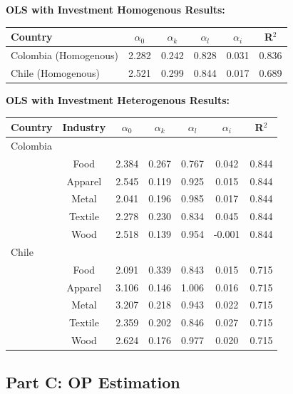 \documentclass{article}
\begin{document}
\textbf{OLS with Investment Homogenous Results:}
\begin{center}
\begin{tabular}[h]{|lccccc|}
  \hline
  \textbf{Country} & \textbf{$\alpha_0$} & \textbf{$\alpha_k$} & \textbf{$\alpha_l$} & \textbf{$\alpha_i$} & \textbf{R$^2$} \\
  \hline
  Colombia (Homogenous) & 2.282 & 0.242 & 0.828 & 0.031 & 0.836 \\
  Chile (Homogenous) & 2.521 & 0.299 & 0.844 & 0.017 & 0.689 \\
  \hline
\end{tabular}
\end{center}

\vspace{1cm}
\textbf{OLS with Investment Heterogenous Results:}
\begin{center}
\begin{tabular}[h]{|lcccccc|}
  \hline
  \textbf{Country} & \textbf{Industry} & \textbf{$\alpha_0$} & \textbf{$\alpha_k$} & \textbf{$\alpha_l$} & \textbf{$\alpha_i$} & \textbf{R$^2$} \\
  \hline
  \hline
  Colombia & & & & & & \\
  \hline
   & Food & 2.384 & 0.267 & 0.767 & 0.042 & 0.844 \\
   & Apparel & 2.545 & 0.119 & 0.925 & 0.015 & 0.844 \\
   & Metal & 2.041 & 0.196 & 0.985 & 0.017 & 0.844 \\
   & Textile & 2.278 & 0.230 & 0.834 & 0.045 & 0.844 \\
   & Wood & 2.518 & 0.139 & 0.954 & -0.001 & 0.844 \\
   \hline
  Chile & & & & & & \\
  \hline
   & Food & 2.091 & 0.339 & 0.843 & 0.015 & 0.715 \\
   & Apparel & 3.106 & 0.146 & 1.006 & 0.016 & 0.715 \\
   & Metal & 3.207 & 0.218 & 0.943 & 0.022 & 0.715 \\
   & Textile & 2.359 & 0.202 & 0.846 & 0.027 & 0.715 \\
   & Wood & 2.624 & 0.176 & 0.977 & 0.020 & 0.715 \\
   \hline
\end{tabular}
\end{center}

\subsection*{Part C: OP Estimation}
\end{document}
